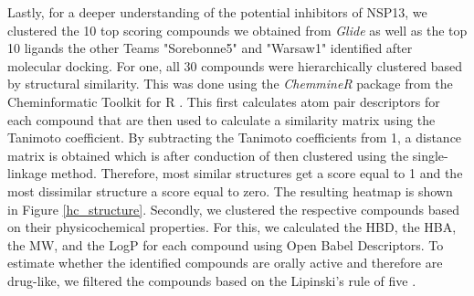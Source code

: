 \documentclass[11pt, letterpaper, titlepage]{article}
\renewcommand{\cite}{\parencite}
\begin{document}
Lastly, for a deeper understanding of the potential inhibitors of NSP13, we clustered the 10 top scoring compounds we obtained from \textit{Glide} as well as the top 10 ligands the other Teams "Sorebonne5" and "Warsaw1" identified after molecular docking. For one, all 30 compounds were hierarchically clustered based by structural similarity. This was done using the \textit{ChemmineR} package from the Cheminformatic Toolkit for R \cite{ChemmineR}. This first calculates atom pair descriptors for each compound that are then used to calculate a similarity matrix using the Tanimoto coefficient. By subtracting the Tanimoto coefficients from 1, a distance matrix is obtained which is after conduction of then clustered using the single-linkage method. Therefore, most similar structures get a score equal to 1 and the most dissimilar structure a score equal to zero. The resulting heatmap is shown in Figure \ref{hc_structure}.
Secondly, we clustered the respective compounds based on their physicochemical properties. For this, we calculated the \ac{HBD}, the \ac{HBA}, the \ac{MW}, and the \ac{LogP} for each compound using Open Babel Descriptors.  To estimate whether the identified compounds are orally active and therefore are drug-like, we filtered the compounds based on the Lipinski's rule of five \cite{Lipinski_1997}. 
\end{document}
